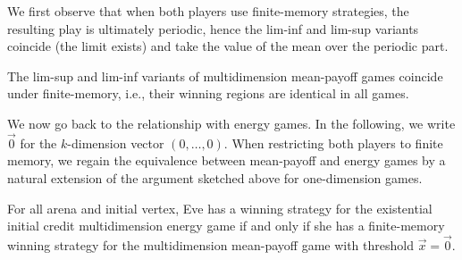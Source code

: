 We first observe that when both players use finite-memory strategies, the resulting play is ultimately periodic, hence the lim-inf and lim-sup variants coincide (the limit exists) and take the value of the mean over the periodic part.

\begin{proposition}
\label{13-prop:MPSI}
The lim-sup and lim-inf variants of multidimension mean-payoff games coincide under finite-memory, i.e., their winning regions are identical in all games.
\end{proposition}

We now go back to the relationship with energy games. In the following, we write  $\vec{0}$ for the $k$-dimension vector $(0,\ldots{},0)$. When restricting both players to finite memory, we regain the equivalence between mean-payoff and energy games by a natural extension of the argument sketched above for one-dimension games.

\begin{theorem}
\label{13-thm:MPEG-equivalence}
For all arena and initial vertex, Eve has a winning strategy for the existential initial credit multidimension energy game if and only if she has a finite-memory winning strategy for the multidimension mean-payoff game with threshold $\vec{x} = \vec{0}$.
\end{theorem}


